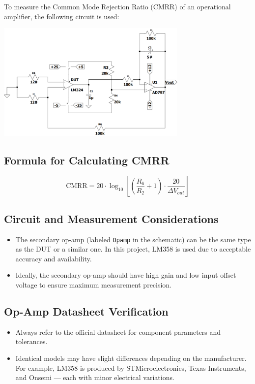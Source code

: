 \documentclass[a4paper,12pt]{article}
\begin{document}
To measure the Common Mode Rejection Ratio (CMRR) of an operational amplifier, the following circuit is used:

\begin{center}
  \includegraphics[width=0.7\textwidth]{IMAGEs/cmrr_test_circuit.png}
\end{center}

\subsection*{Formula for Calculating CMRR}

\begin{equation}
\text{CMRR} = 20 \cdot \log_{10} \left[ \left( \frac{R_6}{R_2} + 1 \right) \cdot \frac{20}{\Delta V_{out}} \right]
\end{equation}

\subsection*{Circuit and Measurement Considerations}

\begin{itemize}
  \item The secondary op-amp (labeled \texttt{Opamp} in the schematic) can be the same type as the DUT or a similar one. In this project, LM358 is used due to acceptable accuracy and availability.
  \item Ideally, the secondary op-amp should have high gain and low input offset voltage to ensure maximum measurement precision.
\end{itemize}

\subsection*{Op-Amp Datasheet Verification}

\begin{itemize}
  \item Always refer to the official datasheet for component parameters and tolerances.
  \item Identical models may have slight differences depending on the manufacturer. For example, LM358 is produced by STMicroelectronics, Texas Instruments, and Onsemi — each with minor electrical variations.
\end{itemize}
\end{document}
